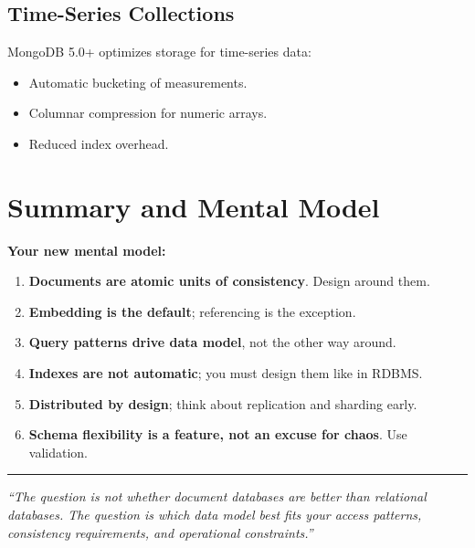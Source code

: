 \documentclass[12pt,a4paper]{article}
\begin{document}
\subsection{Time-Series Collections}

MongoDB 5.0+ optimizes storage for time-series data:
\begin{itemize}[noitemsep]
    \item Automatic bucketing of measurements.
    \item Columnar compression for numeric arrays.
    \item Reduced index overhead.
\end{itemize}

\section{Summary and Mental Model}

\begin{keyinsight}
\textbf{Your new mental model:}
\begin{enumerate}[noitemsep]
    \item \textbf{Documents are atomic units of consistency}. Design around them.
    \item \textbf{Embedding is the default}; referencing is the exception.
    \item \textbf{Query patterns drive data model}, not the other way around.
    \item \textbf{Indexes are not automatic}; you must design them like in RDBMS.
    \item \textbf{Distributed by design}; think about replication and sharding early.
    \item \textbf{Schema flexibility is a feature, not an excuse for chaos}. Use validation.
\end{enumerate}
\end{keyinsight}

\vspace{1cm}
\noindent\rule{\textwidth}{0.4pt}
\begin{center}
\textit{``The question is not whether document databases are better than relational databases. The question is which data model best fits your access patterns, consistency requirements, and operational constraints.''}
\end{center}
\end{document}
